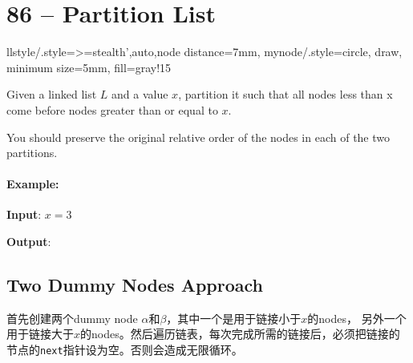\section{86 -- Partition List}
\tikzset
{
llstyle/.style={>=stealth',auto,node distance=7mm},
mynode/.style={circle, draw, minimum size=5mm, fill=gray!15}
}

Given a linked list $L$ and a value $x$, partition it such that all nodes less than x come before nodes greater than or equal to $x$.
\par
You should preserve the original relative order of the nodes in each of the two partitions.
\paragraph{Example:}
\begin{flushleft}
\textbf{Input}: $x=3$
\begin{figure}[H]
\end{figure}
\textbf{Output}:
\begin{figure}[H]
\end{figure}
\end{flushleft}
\subsection{Two Dummy Nodes Approach}
\begin{CJK*}{UTF8}{gbsn}
首先创建两个dummy node $\alpha$和$\beta$，其中一个是用于链接小于$x$的nodes， 另外一个用于链接大于$x$的nodes。然后遍历链表，每次完成所需的链接后，必须把链接的节点的\texttt{next}指针设为空。否则会造成无限循环。
\end{CJK*}
